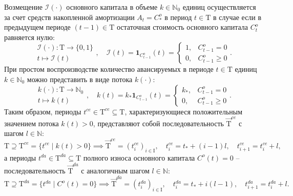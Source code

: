 Возмещение $\mathcal{I}(\cdot)$ основного капитала в объеме $k \in \mathbb{N}_{0}$ единиц осуществляется за счет средств накопленной амортизации $A_t = C^{o}_{*}$ в период $t \in \mathrm{T}$ в случае если в предыдущем периоде $(t-1) \in \mathrm{T}$ остаточная стоимость основного капитала $C^{o}_{t}$ равняется нулю:
\begin{equation}\begin{aligned} \mathcal{I}(\cdot) : \mathrm{T} \longrightarrow \{0,1\} \\ t \longmapsto \mathcal{I}(t) \end{aligned}, \quad \mathcal{I}(t) = \mathbf{1}_{C^{o}_{t-1}}(t) = \begin{cases} 1, &C^{o}_{t-1} = 0 \\ 0, &C^{o}_{t-1} \geq 0 \end{cases}.\end{equation}
При простом воспроизводстве количество авансируемых в периоде $t \in \mathrm{T}$ единиц $k \in \mathbb{N}_{0}$ можно представить в виде потока $k(\cdot)$:
\begin{equation}\begin{aligned}k(\cdot) : \mathrm{T} \longrightarrow \mathbb{N}_{0} \\ t \longmapsto k(t) \end{aligned}, \quad k(t) = k_{*} \mathbf{1}_{C^{o}_{t-1}}(t) = \begin{cases} k_*, &C^{o}_{t-1} = 0 \\ 0, &C^{o}_{t-1} \geq 0 \end{cases}.\end{equation}
Таким образом, периоды $t^{ce} \in \mathrm{T}^{ce} \subseteq \mathrm{T}$, характеризующиеся положительным значением потока $k(t) > 0$, представляют собой последовательность $\overrightarrow{\mathrm{T}}^{ce}$ с шагом $l \in \mathbb{N}$:
\begin{equation}\mathrm{T} \supseteq \mathrm{T}^{ce} = \{t^{ce} \mid k(t) > 0\} \implies \overrightarrow{\mathrm{T}}^{ce} = (t^{ce}_{i})_{i \in \mathrm{I}}, \quad t^{ce}_{i} = t_{*} + (i-1)l, \quad t^{ce}_{i+1} = t^{ce}_{i} + l,\end{equation}
а периоды $t^{da} \in \mathrm{T}^{da} \subseteq \mathrm{T}$ полного износа основного капитала $C^{o}(t) =0$ – последовательность $\overrightarrow{\mathrm{T}}^{da}$ с аналогичным шагом $l \in \mathbb{N}$:
\begin{equation}\mathrm{T} \supseteq \mathrm{T}^{da} = \{t^{da} \mid C^{o}(t)= 0\} \implies \overrightarrow{\mathrm{T}}^{da} = (t^{da}_{i})_{i \in \mathrm{I}}, \quad t^{da}_{i} = t_{*} + i(l-1), \quad t^{da}_{i+1} = t^{da}_{i} + l.\end{equation}
